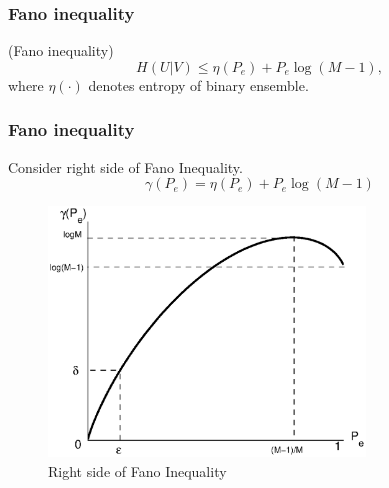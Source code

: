 \documentclass[14pt]{beamer}
\begin{document}
\begin{frame}
\frametitle{Fano inequality}
\begin{itemize}

\begin{theorem}(Fano inequality)
    \begin{equation}
    \label{eq5_23} H(U\vert V) \le \eta(P_e ) + P_e \log (M - 1),
    \end{equation}
    where $\eta(\cdot)$ denotes entropy of binary ensemble.
    \label{th_fano}
\end{theorem}

\end{itemize}
\end{frame}


\begin{frame}
\frametitle{Fano inequality}
\begin{itemize}
Consider right side of Fano Inequality.
\begin{equation}
\label{eq5_24} \gamma (P_e ) = \eta(P_e ) + P_e \log (M - 1)
\end{equation}

\begin{center}
\begin{figure}[ht]
\begin{minipage}{1.0\linewidth}
\includegraphics[width=0.75\textwidth]{fano.eps}
\caption{Right side of Fano Inequality} \label{fano}
\end{minipage}
\end{figure}
\end{center}


\end{itemize}
\end{frame}
\end{document}

